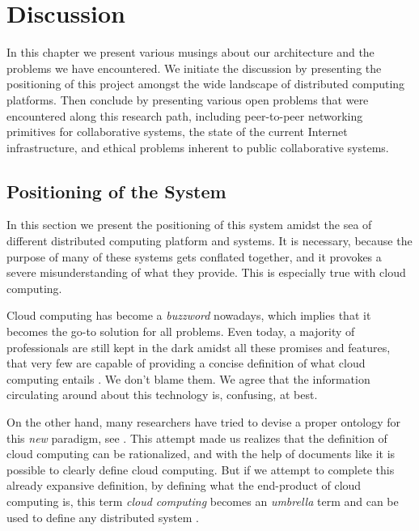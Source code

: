 \documentclass[12pt, titlepage]{uo_temp}
\begin{document}
     \chapter{Discussion}
     In this chapter we present various musings about our architecture and the problems we
     have encountered. We initiate the discussion by presenting the positioning of this
     project amongst the wide landscape of distributed computing platforms. Then conclude
     by presenting various open problems that were encountered along this research path,
     including peer-to-peer networking primitives for collaborative systems, the state of
     the current Internet infrastructure, and ethical problems inherent to public
     collaborative systems.

     \section{Positioning of the System}\label{pos_sys}
     In this section we present the positioning of this system amidst the sea of different
     distributed computing platform and systems. It is necessary, because the
     purpose of many of these systems gets conflated together, and it provokes a severe
     misunderstanding of what they provide. This is especially true with cloud computing.

     Cloud computing has become a \emph{buzzword} nowadays, which implies that it becomes
     the go-to solution for all problems. Even today, a majority of professionals are
     still kept in the dark amidst all these promises and features, that very few are
     capable of providing a concise definition of what cloud computing entails
     \cite{cloud_forbes} \cite{cloud_oneil}. We don't blame them. We agree that the
     information circulating around about this technology is, confusing, at best.

     On the other hand, many researchers have tried to devise a proper ontology for this
     \emph{new} paradigm, see \cite{ontology}. This attempt made us realizes that the
     definition of cloud computing can be rationalized, and with the help of documents
     like \cite{nist} it is possible to clearly define cloud computing. But if we attempt
     to complete this already expansive definition, by defining what the end-product of
     cloud computing is, this term \emph{cloud computing} becomes an \emph{umbrella} term
     and can be used to define any distributed system \cite{cloud_citrix} \cite{cloud_tech}.
\end{document}
